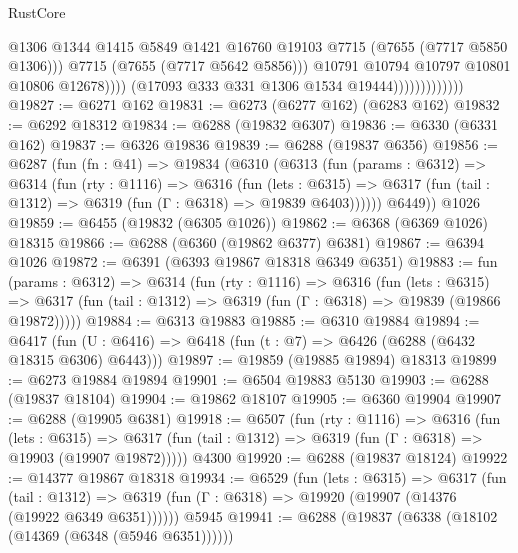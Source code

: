 \begin{lexlean}{RustCore}
\begin{coremodule}
                                        @1306
                                        @1344
                                        @1415
                                        @5849
                                        @1421
                                        @16760
                                        @19103
                                        @7715
                                        (@7655 (@7717 @5850 @1306)))
                                      @7715
                                      (@7655 (@7717 @5642 @5856)))
                                    @10791
                                    @10794
                                    @10797
                                    @10801
                                    @10806
                                    @12678))))
                            (@17093 @333 @331 @1306 @1534 @19444)))))))))))))
@19827 := @6271 @162
@19831 := @6273 (@6277 @162) (@6283 @162)
@19832 := @6292 @18312
@19834 := @6288 (@19832 @6307)
@19836 := @6330 (@6331 @162)
@19837 := @6326 @19836
@19839 := @6288 (@19837 @6356)
@19856 := @6287
    (fun (fn : @41) =>
    @19834
      (@6310
        (@6313
          (fun (params : @6312) =>
          @6314
            (fun (rty : @1116) =>
            @6316
              (fun (lets : @6315) =>
              @6317 (fun (tail : @1312) => @6319 (fun (Γ : @6318) => @19839 @6403))))))
        @6449))
    @1026
@19859 := @6455 (@19832 (@6305 @1026))
@19862 := @6368 (@6369 @1026) @18315
@19866 := @6288 (@6360 (@19862 @6377) @6381)
@19867 := @6394 @1026
@19872 := @6391 (@6393 @19867 @18318 @6349 @6351)
@19883 := fun (params : @6312) =>
  @6314
    (fun (rty : @1116) =>
    @6316
      (fun (lets : @6315) =>
      @6317 (fun (tail : @1312) => @6319 (fun (Γ : @6318) => @19839 (@19866 @19872)))))
@19884 := @6313 @19883
@19885 := @6310 @19884
@19894 := @6417
    (fun (U : @6416) => @6418 (fun (t : @7) => @6426 (@6288 (@6432 @18315 @6306) @6443)))
@19897 := @19859 (@19885 @19894) @18313
@19899 := @6273 @19884 @19894
@19901 := @6504 @19883 @5130
@19903 := @6288 (@19837 @18104)
@19904 := @19862 @18107
@19905 := @6360 @19904
@19907 := @6288 (@19905 @6381)
@19918 := @6507
    (fun (rty : @1116) =>
    @6316
      (fun (lets : @6315) =>
      @6317 (fun (tail : @1312) => @6319 (fun (Γ : @6318) => @19903 (@19907 @19872)))))
    @4300
@19920 := @6288 (@19837 @18124)
@19922 := @14377 @19867 @18318
@19934 := @6529
    (fun (lets : @6315) =>
    @6317
      (fun (tail : @1312) =>
      @6319 (fun (Γ : @6318) => @19920 (@19907 (@14376 (@19922 @6349 @6351))))))
    @5945
@19941 := @6288 (@19837 (@6338 (@18102 (@14369 (@6348 (@5946 @6351))))))

\end{coremodule}
\end{lexlean}
